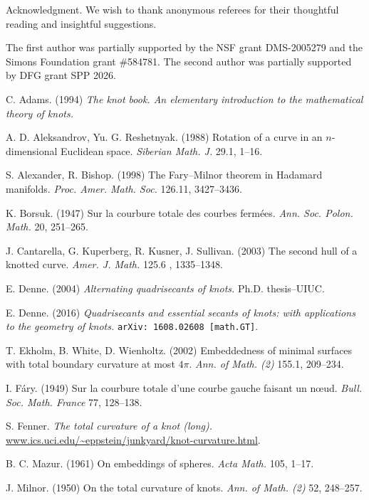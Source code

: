 \documentclass{article}
\theoremstyle{theorem}
\newtheorem{Crofton-type formula}[theorem]{Crofton-type formula}
\newtheorem{Douglas--Rado theorem}[theorem]{Douglas--Rado theorem}
\newtheorem{Extended monotonicity theorem}[theorem]{Extended monotonicity theorem}
\theoremstyle{definition}
\begin{document}
\begin{acknowledgment}{Acknowledgment.}
We wish to thank anonymous referees for their thoughtful reading and insightful suggestions.

The first author was partially supported by the NSF grant DMS-2005279 and the Simons Foundation grant \#584781.
The second author was partially supported by DFG grant SPP 2026.
\end{acknowledgment}

\begin{thebibliography}{2}
C. Adams. (1994) \textit{The knot book. An elementary introduction to the mathematical theory of knots.}

A. D. Aleksandrov, Yu. G. Reshetnyak. (1988) Rotation of a curve in an $n$-dimensional Euclidean
space. \textit{Siberian Math. J.} 29.1, 1--16.

S. Alexander, R. Bishop. (1998) The Fary--Milnor theorem in Hadamard manifolds. \textit{Proc. Amer.
Math. Soc.} 126.11, 3427--3436.

K. Borsuk. (1947) Sur la courbure totale des courbes fermées. \textit{Ann. Soc. Polon. Math.} 20,
251--265.


J. Cantarella, G. Kuperberg, R. Kusner, J. Sullivan. (2003) The second hull of a knotted curve.
\textit{Amer. J. Math.} 125.6 , 1335--1348.


E. Denne. (2004) \textit{Alternating quadrisecants of knots.} Ph.D. thesis–UIUC.


E. Denne. (2016) \textit{Quadrisecants and essential secants of knots: with applications to the geometry
of knots.} \texttt{arXiv: 1608.02608 [math.GT]}.

T. Ekholm, B. White, D. Wienholtz. (2002)
Embeddedness of minimal surfaces with total boundary
curvature at most $4\pi$. \textit{Ann. of Math. (2)} 155.1, 209--234.


I. Fáry. (1949) Sur la courbure totale d’une courbe gauche faisant un nœud. \textit{Bull. Soc. Math.
France} 77, 128–138.

S. Fenner. \textit{The total curvature of a knot (long).} \url{www.ics.uci.edu/~eppstein/junkyard/knot-curvature.html}.


B. C. Mazur. 
(1961)
On embeddings of spheres.
\textit{Acta Math.} 105, 1–17.

J. Milnor. 
(1950)
On the total curvature of knots.
\textit{Ann. of Math. (2)} 52, 248--257.



\end{thebibliography}
\end{document}
